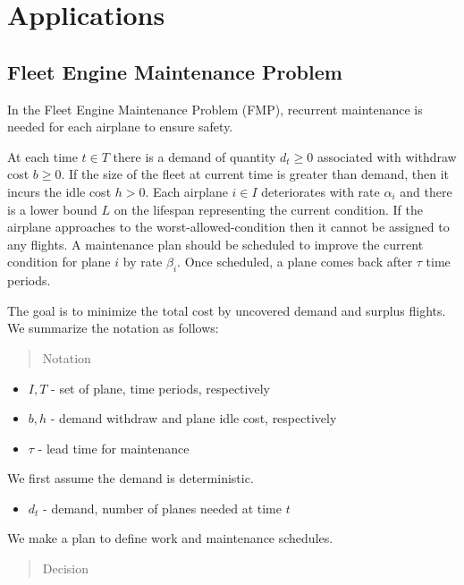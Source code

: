 \documentclass[../main]{subfiles}
\begin{document}
\section{Applications}\label{sec:app}

\subsection{Fleet Engine Maintenance Problem}\label{sec:fmp}

In the Fleet Engine Maintenance Problem (FMP), recurrent maintenance is needed for each airplane to ensure safety.

At each time \(t \in T\) there is a demand of quantity \(d_t \ge 0\) associated with withdraw cost \(b \ge 0\).
If the size of the fleet at current time is greater than demand, then it incurs the idle cost \(h > 0\).
Each airplane \(i \in I\) deteriorates with rate \(\alpha_i\) and there is a lower bound \(L\) on the lifespan representing the current condition. If the airplane approaches to the worst-allowed-condition then it cannot be assigned to any flights.
A maintenance plan should be scheduled to improve the current condition for plane \(i\) by rate \(\beta_i\). Once scheduled, a plane comes back after \(\tau\) time periods.

The goal is to minimize the total cost by uncovered demand and surplus flights. We summarize the notation as follows:

\begin{quote}
  Notation
\end{quote}

\begin{itemize}
  \tightlist
  \item
        \(I, T\) - set of plane, time periods, respectively
  \item
        \(b, h\) - demand withdraw and plane idle cost, respectively
  \item
        \(\tau\) - lead time for maintenance
\end{itemize}

We first assume the demand is deterministic.

\begin{itemize}
  \tightlist
  \item
        \(d_t\) - demand, number of planes needed at time \(t\)
\end{itemize}

We make a plan to define work and maintenance schedules.

\begin{quote}
  Decision
\end{quote}
\end{document}

